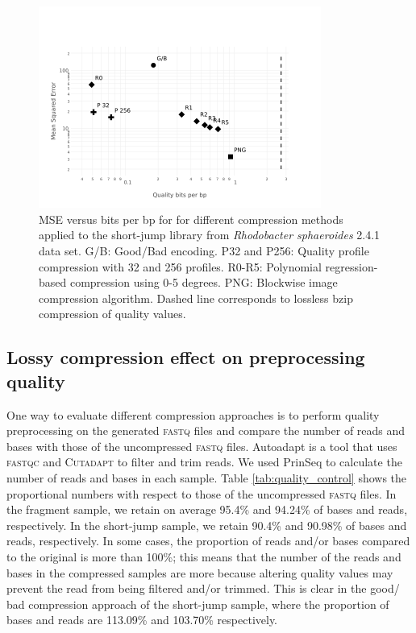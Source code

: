 \documentclass{bioinfo}
\begin{document}
\begin{figure}[!tpb]%
\centerline{\includegraphics[width=3.65in]{mse_short.png}}
\caption{MSE versus bits per bp for for different compression methods applied to the short-jump library from \textit{Rhodobacter sphaeroides} 2.4.1 data set. G/B: Good/Bad encoding. P32 and P256: Quality profile compression with 32 and 256 profiles. R0-R5: Polynomial regression-based compression using 0-5 degrees. PNG: Blockwise image compression algorithm. Dashed line corresponds to lossless bzip compression of quality values. \em}\label{fig:mse_vs_bpbp_jump}
\end{figure}

\subsection{Lossy compression effect on preprocessing quality}

One way to evaluate different compression approaches is to perform quality preprocessing on the generated \textsc{fastq} files and compare the number of reads and bases with those of the uncompressed \textsc{fastq} files.
Autoadapt is a tool that uses \textsc{fastqc} and \textsc{Cutadapt}  to filter and trim reads.
We used PrinSeq to calculate the number of reads and bases in each sample. Table \ref{tab:quality_control} shows the proportional numbers with respect to those of the uncompressed \textsc{fastq} files.
In the fragment sample, we retain on average 95.4\% and 94.24\%  of bases and reads, respectively. In the short-jump sample, we retain 90.4\% and 90.98\% of bases and reads, respectively. In some cases, the proportion of reads and/or bases compared to the original is more than 100\%; this means that the number of the reads and bases in the compressed samples are more because altering quality values may prevent the read from being filtered and/or trimmed. This is clear in the good/ bad compression approach of the short-jump sample, where the proportion of bases and reads are 113.09\%  and 103.70\% respectively.
\end{document}
